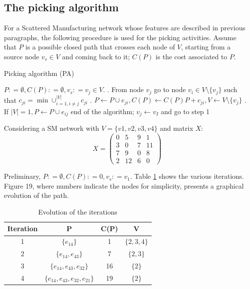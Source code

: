 \subsection{The picking algorithm}
For a Scattered Manufacturing network whose features are described in previous paragraphs, the following procedure is used for the picking activities. Assume that $P$ is a possible closed path that crosses each node of $V$, starting from a source node $ v_s \in V$ and coming back to it; $C(P)$ is the cost associated to $P$.
\begin{algorithm}
    \caption{Picking algorithm (PA)}
    \label{listing7}
    \begin{algorithmic}[1]
        \State $P : = \emptyset, C(P) : = \emptyset, v_s : = v_j \in V$.
        \EndProcedure
        . From node $v_j$ go to node $v_i \in V\setminus\{v_j\}$ such that $c_{ji} = \min\cup^{|V|}_{i=1,i\neq j} c_{ji}$
        . $P \leftarrow P \cup e_{ji}, C(P) \leftarrow C(P)P + c_{ji}, V \leftarrow V\setminus \{v_j\}$ 
        . \If If $|V| = 1, P \leftarrow P\cup e_{ij}$ \Return end of the algorithm; \Else  $v_j \leftarrow v_I$ and go to step 1 \EndIf
        \EndProcedure
    \end{algorithmic} 
\end{algorithm}

Considering a SM network with $V = \{v1, v2, v3, v4\}$ and matrix $X$:
\begin{equation}
    \label{eq:x-matrix-sample-initialization}
    X = \begin{pmatrix} 0 & 5 & 9 & 1\\ 3 & 0 & 7 & 11\\ 7 & 9 & 0 & 8\\ 2 & 12 & 6 & 0 \end{pmatrix}
\end{equation}

Preliminary, $P : = \emptyset , C(P) : = 0, v_s : = v_1$. Table \ref{tab:evolution-of-iterations} shows the various iterations. Figure 19, where numbers indicate the nodes for simplicity, presents a graphical evolution of the path.
\begin{table}
    \centering
    \begin{tabular}{|c|c|c|c|}
        \hline
        \textbf{Iteration} & \textbf{P} & \textbf{C(P)} & \textbf{V} \\
        \hline
        1 & $\{e_{14}\}$ & 1 & $\{2,3,4\}$\\
        \hline
        2 & $\{e_{14}, e_{43}\}$ & 7 & $\{2,3\}$\\
        \hline
        3 & $\{e_{14}, e_{43}, e_{32}\}$ & 16 & $\{2\}$\\
        \hline
        4 & $\{e_{14}, e_{43}, e_{32}, e_{21}\}$ & 19 & $\{2\}$\\
        \hline
    \end{tabular}

    \caption{Evolution of the iterations}
    \label{tab:evolution-of-iterations}
\end{table}


